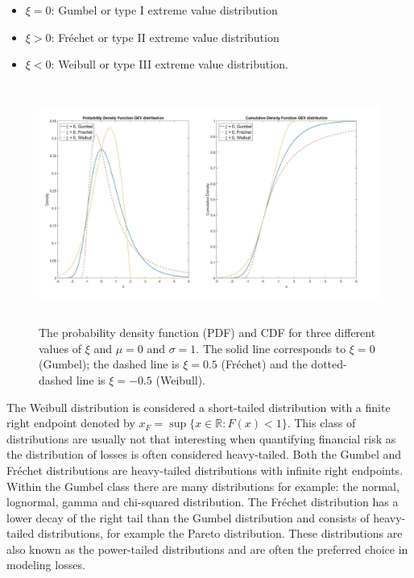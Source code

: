\documentclass[a4paper,12pt]{article}
\theoremstyle{plain}
\begin{document}
\begin{itemize}
    \item $\xi=0$: Gumbel or type I extreme value distribution
    \item $\xi>0$: Fr\'echet or type II extreme value distribution
    \item $\xi<0$: Weibull or type III extreme value distribution.
\end{itemize}

\begin{figure}[H]
\includegraphics[height=7.8cm, width=\linewidth]{Figures/gev.jpg} 
\caption{The probability density function (PDF) and CDF for three different values of $\xi$ and $\mu=0$ and $\sigma=1$. The solid line corresponds to $\xi=0$ (Gumbel); the dashed line is $\xi=0.5$ (Fr\'echet) and the dotted-dashed line is $\xi=-0.5$ (Weibull).}
\label{fig:gev}
\end{figure}

The Weibull distribution is considered a short-tailed distribution with a finite right endpoint denoted by $x_F=\sup\{x\in\mathbb{R}: F(x) < 1\}$. This class of distributions are usually not that interesting when quantifying financial risk as the distribution of losses is often considered heavy-tailed. Both the Gumbel and Fr\'echet distributions are heavy-tailed distributions with infinite right endpoints. Within the Gumbel class there are many distributions for example: the normal, lognormal, gamma and chi-squared distribution. The Fr\'echet distribution has a lower decay of the right tail than the Gumbel distribution and consists of heavy-tailed distributions, for example the Pareto distribution. These distributions are also known as the power-tailed distributions and are often the preferred choice in modeling losses.\\
\end{document}
